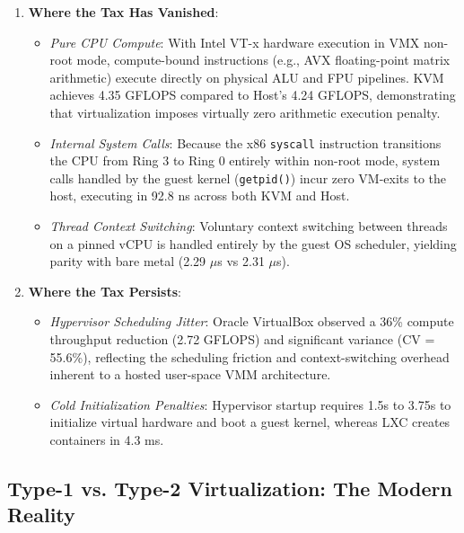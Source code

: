 \begin{enumerate}
    \item \textbf{Where the Tax Has Vanished}:
    \begin{itemize}
        \item \textit{Pure CPU Compute}: With Intel VT-x hardware execution in VMX non-root mode, compute-bound instructions (e.g., AVX floating-point matrix arithmetic) execute directly on physical ALU and FPU pipelines. KVM achieves 4.35 GFLOPS compared to Host's 4.24 GFLOPS, demonstrating that virtualization imposes virtually zero arithmetic execution penalty.
        \item \textit{Internal System Calls}: Because the x86 \texttt{syscall} instruction transitions the CPU from Ring 3 to Ring 0 entirely within non-root mode, system calls handled by the guest kernel (\texttt{getpid()}) incur zero VM-exits to the host, executing in 92.8 ns across both KVM and Host.
        \item \textit{Thread Context Switching}: Voluntary context switching between threads on a pinned vCPU is handled entirely by the guest OS scheduler, yielding parity with bare metal (2.29 $\mu$s vs 2.31 $\mu$s).
    \end{itemize}
    \item \textbf{Where the Tax Persists}:
    \begin{itemize}
        \item \textit{Hypervisor Scheduling Jitter}: Oracle VirtualBox observed a 36\% compute throughput reduction (2.72 GFLOPS) and significant variance (CV = 55.6\%), reflecting the scheduling friction and context-switching overhead inherent to a hosted user-space VMM architecture.
        \item \textit{Cold Initialization Penalties}: Hypervisor startup requires 1.5s to 3.75s to initialize virtual hardware and boot a guest kernel, whereas LXC creates containers in 4.3 ms.
    \end{itemize}
\end{enumerate}

\subsection{Type-1 vs. Type-2 Virtualization: The Modern Reality}
\label{subsec:type1_vs_type2}

